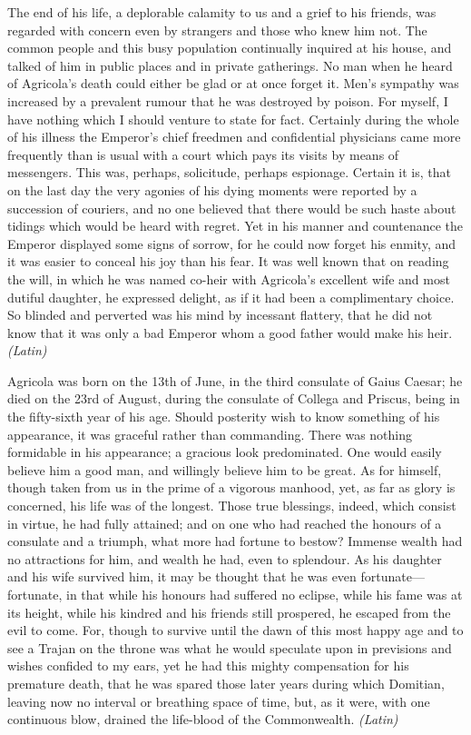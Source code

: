 
The end of his life, a deplorable calamity to us and a grief to his friends, was regarded with concern even by strangers and those who knew him not. The common people and this busy population continually inquired at his house, and talked of him in public places and in private gatherings. No man when he heard of Agricola's death could either be glad or at once forget it. Men's sympathy was increased by a prevalent rumour that he was destroyed by poison. For myself, I have nothing which I should venture to state for fact. Certainly during the whole of his illness the Emperor's chief freedmen and confidential physicians came more frequently than is usual with a court which pays its visits by means of messengers. This was, perhaps, solicitude, perhaps espionage. Certain it is, that on the last day the very agonies of his dying moments were reported by a succession of couriers, and no one believed that there would be such haste about tidings which would be heard with regret. Yet in his manner and countenance the Emperor displayed some signs of sorrow, for he could now forget his enmity, and it was easier to conceal his joy than his fear. It was well known that on reading the will, in which he was named co-heir with Agricola's excellent wife and most dutiful daughter, he expressed delight, as if it had been a complimentary choice. So blinded and perverted was his mind by incessant flattery, that he did not know that it was only a bad Emperor whom a good father would make his heir. \emph{(Latin)}


Agricola was born on the 13th of June, in the third consulate of Gaius Caesar; he died on the 23rd of August, during the consulate of Collega and Priscus, being in the fifty-sixth year of his age. Should posterity wish to know something of his appearance, it was graceful rather than commanding. There was nothing formidable in his appearance; a gracious look predominated. One would easily believe him a good man, and willingly believe him to be great. As for himself, though taken from us in the prime of a vigorous manhood, yet, as far as glory is concerned, his life was of the longest. Those true blessings, indeed, which consist in virtue, he had fully attained; and on one who had reached the honours of a consulate and a triumph, what more had fortune to bestow? Immense wealth had no attractions for him, and wealth he had, even to splendour. As his daughter and his wife survived him, it may be thought that he was even fortunate—fortunate, in that while his honours had suffered no eclipse, while his fame was at its height, while his kindred and his friends still prospered, he escaped from the evil to come. For, though to survive until the dawn of this most happy age and to see a Trajan on the throne was what he would speculate upon in previsions and wishes confided to my ears, yet he had this mighty compensation for his premature death, that he was spared those later years during which Domitian, leaving now no interval or breathing space of time, but, as it were, with one continuous blow, drained the life-blood of the Commonwealth. \emph{(Latin)}

